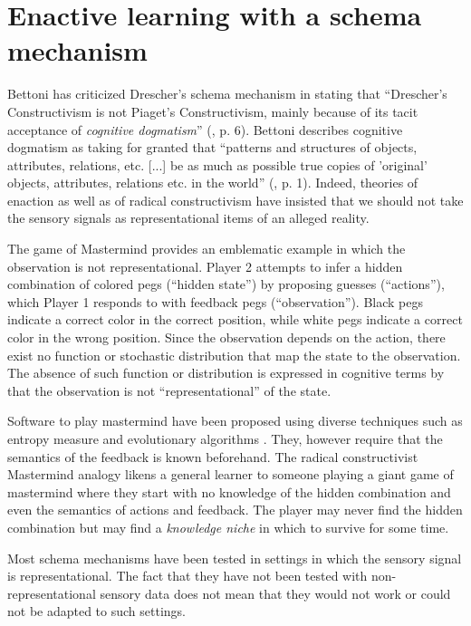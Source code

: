 \documentclass[runningheads]{llncs}
\begin{document}
\section{Enactive learning with a schema mechanism}

Bettoni  has criticized Drescher's schema mechanism in stating that ``Drescher's Constructivism is not Piaget's Constructivism, mainly because of its tacit acceptance of \textit{cognitive dogmatism}'' (\cite{bettoni_made-up_1993}, p. 6).
Bettoni describes cognitive dogmatism as taking for granted that ``patterns and structures of objects, attributes, relations, etc. [...] be as much as possible true copies of 'original' objects, attributes, relations etc. in the world'' (\cite{bettoni_made-up_1993}, p. 1).
Indeed, theories of enaction as well as of radical constructivism have insisted that we should not take the sensory signals as representational items of an alleged reality. 


The game of Mastermind provides an emblematic example in which the observation is not representational. 
Player 2 attempts to infer a hidden combination of colored pegs (``hidden state'') by proposing guesses (``actions''), which Player 1 responds to with feedback pegs (``observation''). Black pegs indicate a correct color in the correct position, while white pegs indicate a correct color in the wrong position.
Since the observation depends on the action, there exist no function or stochastic distribution that map the state to the observation. 
The absence of such function or distribution is expressed in cognitive terms by that the observation is not ``representational'' of the state.

Software to play mastermind have been proposed using diverse techniques such as entropy measure and evolutionary algorithms \cite{cotta_entropy-driven_2010}.
They, however require that the semantics of the feedback is known beforehand. 
The radical constructivist Mastermind analogy likens a general learner to someone playing a giant game of mastermind where they start with no knowledge of the hidden combination and even the semantics of actions and feedback.
The player may never find the hidden combination but may find a \textit{knowledge niche} in which to survive for some time.

Most schema mechanisms have been tested in settings in which the sensory signal is representational.
The fact that they have not been tested with non-representational sensory data does not mean that they would not work or could not be adapted to such settings. 
\end{document}
